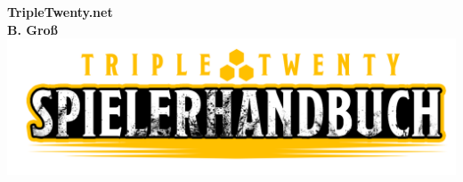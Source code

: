 \documentclass[10pt,twoside,openany,twocolumn]{book}
\begin{document}
\selectfont %

\begin{titlepage}
    \centering
    \vfill
    {\bfseries\Large
        TripleTwenty.net\\
        B. Groß
    }
    \vfill
    \includegraphics[width=\textwidth]{img/cover_title} %
    \vfill
    \vfill
\end{titlepage}
\newpage







\end{document}
